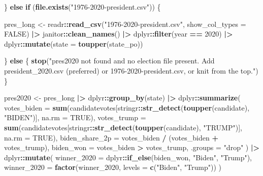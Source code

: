 \documentclass[
  11pt,
]{article}
\newenvironment{Shaded}{\begin{snugshade}}{\end{snugshade}}
\newcommand{\AttributeTok}[1]{\textcolor[rgb]{0.13,0.29,0.53}{#1}}
\newcommand{\ConstantTok}[1]{\textcolor[rgb]{0.56,0.35,0.01}{#1}}
\newcommand{\ControlFlowTok}[1]{\textcolor[rgb]{0.13,0.29,0.53}{\textbf{#1}}}
\newcommand{\DecValTok}[1]{\textcolor[rgb]{0.00,0.00,0.81}{#1}}
\newcommand{\FunctionTok}[1]{\textcolor[rgb]{0.13,0.29,0.53}{\textbf{#1}}}
\newcommand{\NormalTok}[1]{#1}
\newcommand{\OtherTok}[1]{\textcolor[rgb]{0.56,0.35,0.01}{#1}}
\newcommand{\SpecialCharTok}[1]{\textcolor[rgb]{0.81,0.36,0.00}{\textbf{#1}}}
\newcommand{\StringTok}[1]{\textcolor[rgb]{0.31,0.60,0.02}{#1}}
\begin{document}
\begin{Shaded}
\begin{Highlighting}[]
\NormalTok{  \} }\ControlFlowTok{else} \ControlFlowTok{if}\NormalTok{ (}\FunctionTok{file.exists}\NormalTok{(}\StringTok{"1976{-}2020{-}president.csv"}\NormalTok{)) \{}

\NormalTok{    pres\_long }\OtherTok{\textless{}{-}}\NormalTok{ readr}\SpecialCharTok{::}\FunctionTok{read\_csv}\NormalTok{(}\StringTok{"1976{-}2020{-}president.csv"}\NormalTok{, }\AttributeTok{show\_col\_types =} \ConstantTok{FALSE}\NormalTok{) }\SpecialCharTok{|\textgreater{}}
\NormalTok{      janitor}\SpecialCharTok{::}\FunctionTok{clean\_names}\NormalTok{() }\SpecialCharTok{|\textgreater{}}
\NormalTok{      dplyr}\SpecialCharTok{::}\FunctionTok{filter}\NormalTok{(year }\SpecialCharTok{==} \DecValTok{2020}\NormalTok{) }\SpecialCharTok{|\textgreater{}}
\NormalTok{      dplyr}\SpecialCharTok{::}\FunctionTok{mutate}\NormalTok{(}\AttributeTok{state =} \FunctionTok{toupper}\NormalTok{(state\_po))}

\NormalTok{  \} }\ControlFlowTok{else}\NormalTok{ \{}
    \FunctionTok{stop}\NormalTok{(}\StringTok{"pres2020 not found and no election file present. Add president\_2020.csv (preferred) or 1976{-}2020{-}president.csv, or knit from the top."}\NormalTok{)}
\NormalTok{  \}}

\NormalTok{  pres2020 }\OtherTok{\textless{}{-}}\NormalTok{ pres\_long }\SpecialCharTok{|\textgreater{}}
\NormalTok{    dplyr}\SpecialCharTok{::}\FunctionTok{group\_by}\NormalTok{(state) }\SpecialCharTok{|\textgreater{}}
\NormalTok{    dplyr}\SpecialCharTok{::}\FunctionTok{summarize}\NormalTok{(}
      \AttributeTok{votes\_biden =} \FunctionTok{sum}\NormalTok{(candidatevotes[stringr}\SpecialCharTok{::}\FunctionTok{str\_detect}\NormalTok{(}\FunctionTok{toupper}\NormalTok{(candidate), }\StringTok{"BIDEN"}\NormalTok{)], }\AttributeTok{na.rm =} \ConstantTok{TRUE}\NormalTok{),}
      \AttributeTok{votes\_trump =} \FunctionTok{sum}\NormalTok{(candidatevotes[stringr}\SpecialCharTok{::}\FunctionTok{str\_detect}\NormalTok{(}\FunctionTok{toupper}\NormalTok{(candidate), }\StringTok{"TRUMP"}\NormalTok{)], }\AttributeTok{na.rm =} \ConstantTok{TRUE}\NormalTok{),}
      \AttributeTok{biden\_share\_2p =}\NormalTok{ votes\_biden }\SpecialCharTok{/}\NormalTok{ (votes\_biden }\SpecialCharTok{+}\NormalTok{ votes\_trump),}
      \AttributeTok{biden\_won =}\NormalTok{ votes\_biden }\SpecialCharTok{\textgreater{}}\NormalTok{ votes\_trump,}
      \AttributeTok{.groups =} \StringTok{"drop"}
\NormalTok{    ) }\SpecialCharTok{|\textgreater{}}
\NormalTok{    dplyr}\SpecialCharTok{::}\FunctionTok{mutate}\NormalTok{(}
      \AttributeTok{winner\_2020 =}\NormalTok{ dplyr}\SpecialCharTok{::}\FunctionTok{if\_else}\NormalTok{(biden\_won, }\StringTok{"Biden"}\NormalTok{, }\StringTok{"Trump"}\NormalTok{),}
      \AttributeTok{winner\_2020 =} \FunctionTok{factor}\NormalTok{(winner\_2020, }\AttributeTok{levels =} \FunctionTok{c}\NormalTok{(}\StringTok{"Biden"}\NormalTok{, }\StringTok{"Trump"}\NormalTok{))}
\NormalTok{    )}


\end{Highlighting}
\end{Shaded}
\end{document}
